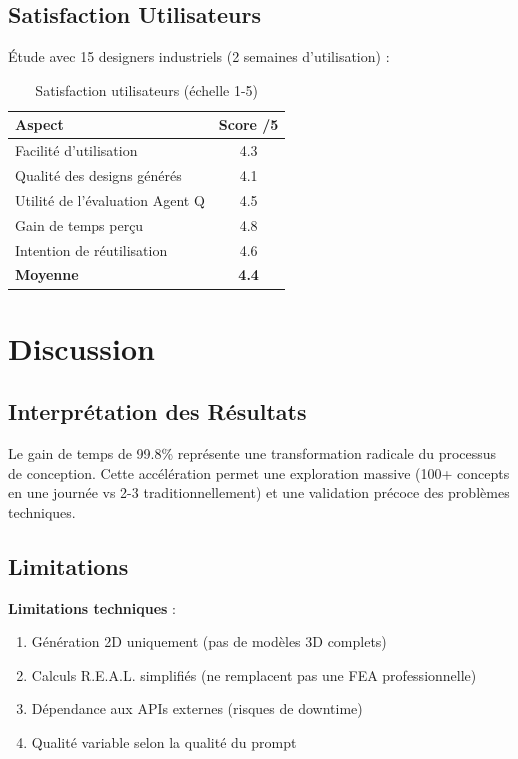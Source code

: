 \documentclass[12pt,a4paper]{article}
\begin{document}
\subsection{Satisfaction Utilisateurs}

Étude avec 15 designers industriels (2 semaines d'utilisation) :

\begin{table}[H]
\centering
\caption{Satisfaction utilisateurs (échelle 1-5)}
\begin{tabular}{@{}lc@{}}
\toprule
\textbf{Aspect} & \textbf{Score /5} \\ 
\midrule
Facilité d'utilisation & 4.3 \\
Qualité des designs générés & 4.1 \\
Utilité de l'évaluation Agent Q & 4.5 \\
Gain de temps perçu & 4.8 \\
Intention de réutilisation & 4.6 \\
\midrule
\textbf{Moyenne} & \textbf{4.4} \\
\bottomrule
\end{tabular}
\end{table}

\section{Discussion}

\subsection{Interprétation des Résultats}

Le gain de temps de 99.8\% représente une transformation radicale du processus de conception. Cette accélération permet une exploration massive (100+ concepts en une journée vs 2-3 traditionnellement) et une validation précoce des problèmes techniques.

\subsection{Limitations}

\textbf{Limitations techniques} :
\begin{enumerate}
    \item Génération 2D uniquement (pas de modèles 3D complets)
    \item Calculs R.E.A.L. simplifiés (ne remplacent pas une FEA professionnelle)
    \item Dépendance aux APIs externes (risques de downtime)
    \item Qualité variable selon la qualité du prompt
\end{enumerate}
\end{document}
